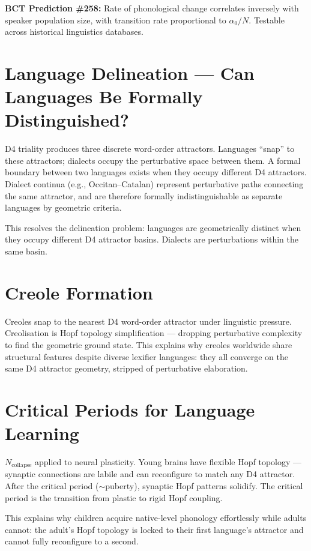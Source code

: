 \documentclass[aps,prl,twocolumn,superscriptaddress]{revtex4-2}
\begin{document}
\textbf{BCT Prediction \#258:} Rate of phonological change correlates inversely with speaker population size, with transition rate proportional to $\alpha_0 / N$. Testable across historical linguistics databases.

\section{Language Delineation --- Can Languages Be Formally Distinguished?}

D4 triality produces three discrete word-order attractors. Languages ``snap'' to these attractors; dialects occupy the perturbative space between them. A formal boundary between two languages exists when they occupy different D4 attractors. Dialect continua (e.g., Occitan--Catalan) represent perturbative paths connecting the same attractor, and are therefore formally indistinguishable as separate languages by geometric criteria.

This resolves the delineation problem: languages are geometrically distinct when they occupy different D4 attractor basins. Dialects are perturbations within the same basin.

\section{Creole Formation}

Creoles snap to the nearest D4 word-order attractor under linguistic pressure. Creolisation is Hopf topology simplification --- dropping perturbative complexity to find the geometric ground state. This explains why creoles worldwide share structural features despite diverse lexifier languages: they all converge on the same D4 attractor geometry, stripped of perturbative elaboration.

\section{Critical Periods for Language Learning}

$N_{\mathrm{collapse}}$ applied to neural plasticity. Young brains have flexible Hopf topology --- synaptic connections are labile and can reconfigure to match any D4 attractor. After the critical period ($\sim$puberty), synaptic Hopf patterns solidify. The critical period is the transition from plastic to rigid Hopf coupling.

This explains why children acquire native-level phonology effortlessly while adults cannot: the adult's Hopf topology is locked to their first language's attractor and cannot fully reconfigure to a second.
\end{document}
